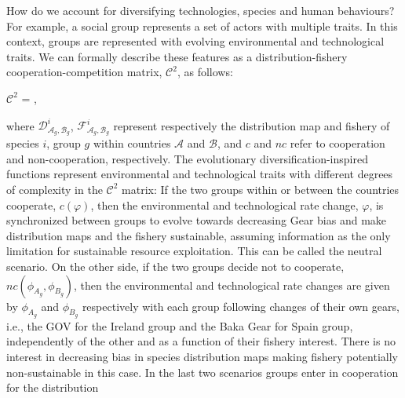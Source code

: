 \documentclass[12pt,a4paper]{article}
\begin{document}
{\begin{tcolorbox}[colback=green!5!white,colframe=green!75!black]
How do we account for diversifying technologies, species and human behaviours? For example, a social group represents a set of actors with multiple traits. In this context, groups are represented with evolving environmental and technological traits. We can formally describe these features as a distribution-fishery cooperation-competition matrix,
  $\mathcal{C}^{2}$, as follows:
  \vspace{-0.20 in}\\
\begin{center}
  $\mathcal{C}^2$ = , 
    \vspace{-0.05 in}
\end{center}
where $\mathcal{D}^{i}_{\mathcal{A}_{g},\mathcal{B}_{g}}$, $\mathcal{F}^{i}_{\mathcal{A}_{g},\mathcal{B}_{g}}$ represent respectively the distribution map and fishery of species $i$, group $g$ within countries $\mathcal{A}$ and $\mathcal{B}$, and $c$ and $nc$ refer to cooperation and non-cooperation, respectively. The evolutionary diversification-inspired functions represent environmental and technological traits with different degrees of complexity in the $\mathcal{C}^2$ matrix: If the two groups within or between the countries cooperate, $c(\varphi)$, then the environmental and technological rate change, $\varphi$, is synchronized between groups to evolve towards decreasing Gear bias and make distribution maps and the fishery sustainable, assuming information as the only limitation for sustainable resource exploitation. This can be called the neutral scenario. On the other side, if the two groups decide not to cooperate, $nc(\phi_{A_{g}},\phi_{B_{g}})$, then the environmental and technological rate changes are given by $\phi_{A_{g}}$ and
$\phi_{B_{g}}$ respectively with each group following changes of their own gears, i.e., the GOV for the Ireland group and the Baka Gear for Spain group,
independently of the other and as a function of their fishery interest. There is no interest in decreasing bias in species distribution maps making fishery potentially non-sustainable in this case. In the last two scenarios groups enter in cooperation for the distribution

\end{tcolorbox}}
\end{document}
